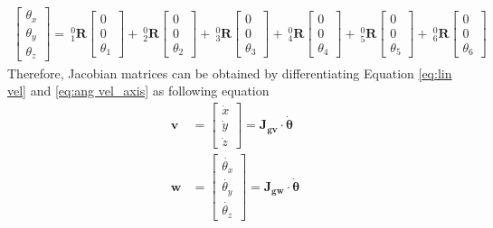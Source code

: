 \begin{equation}
\label{eq:ang vel_axis}
\begin{split}
\begin{bmatrix}
\theta _x \\
\theta _y \\
\theta _z 
\end{bmatrix}
=
\ ^0_1\mathbf{R}
\begin{bmatrix}
0 \\ 
0 \\ 
\theta _1
\end{bmatrix}
+
\ ^0_2\mathbf{R}
\begin{bmatrix}
0 \\ 
0 \\ 
\theta _2
\end{bmatrix}
+
\ ^0_3\mathbf{R}
\begin{bmatrix}
0 \\ 
0 \\ 
\theta _3
\end{bmatrix}
+
\ ^0_4\mathbf{R}
\begin{bmatrix}
0 \\ 
0 \\ 
\theta _4
\end{bmatrix}
+
\ ^0_5\mathbf{R}
\begin{bmatrix}
0 \\ 
0 \\ 
\theta _5
\end{bmatrix}
+
\ ^0_6\mathbf{R}
\begin{bmatrix}
0 \\ 
0 \\ 
\theta _6
\end{bmatrix}
\end{split}
\end{equation}
Therefore, Jacobian matrices can be obtained by differentiating Equation \ref{eq:lin vel} and \ref{eq:ang vel_axis} as following equation
\begin{equation}
\begin{split}
\boldsymbol{v} 
&= 
\begin{bmatrix}
\dot{x}\\
\dot{y}\\
\dot{z}
\end{bmatrix}
=
\mathbf{J_{gv}} \cdot \boldsymbol{\dot{\theta}}
\\
\boldsymbol{w} 
&= 
\begin{bmatrix}
\dot{\theta _x}\\
\dot{\theta _y}\\
\dot{\theta _z}
\end{bmatrix}
=
\mathbf{J_{gw}} \cdot \boldsymbol{\dot{\theta}}
\end{split}
\end{equation}
